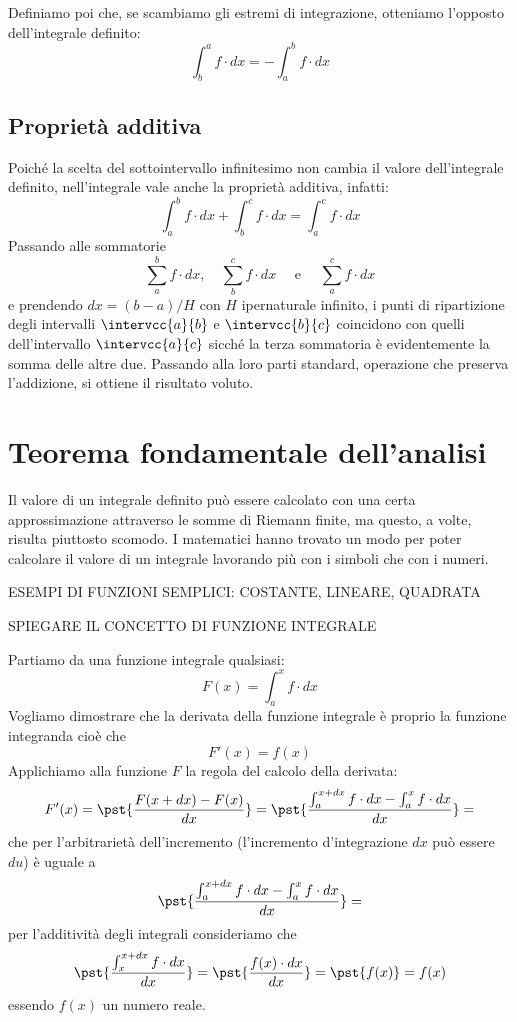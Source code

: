 Definiamo poi che, se scambiamo gli estremi di integrazione, otteniamo 
l'opposto dell'integrale definito:
\[\int_b^a f \cdot dx = - \int_a^b f \cdot dx\]

\subsection{Proprietà additiva}
\label{subsec:integrali_proprieta_additiva}

Poiché la scelta del sottointervallo infinitesimo non cambia il valore 
dell'integrale definito, 
nell'integrale vale anche la proprietà additiva, infatti: 
\[\int_a^b f \cdot dx + \int_b^c f \cdot dx = \int_a^c f \cdot 
dx\] 
Passando alle sommatorie 
\[\sum_a^b f \cdot dx,\quad \sum_b^c f \cdot dx \quad\text{ e } \quad 
  \sum_a^c f \cdot dx\] 
e prendendo 
\(dx = (b-a)/H\)
con \(H\) ipernaturale infinito, 
i punti di ripartizione degli intervalli \(\intervcc{a}{b}\) e 
\(\intervcc{b}{c}\) coincidono con quelli dell'intervallo \(\intervcc{a}{c}\)
sicché la terza sommatoria è evidentemente la somma delle altre due.
Passando alla loro parti standard, operazione che preserva l'addizione, si 
ottiene il risultato voluto.

\section{Teorema fondamentale dell'analisi}
\label{sec:integrali_teorema_fondamentale}

Il valore di un integrale definito può essere calcolato con una certa 
approssimazione attraverso le somme di Riemann finite, ma questo, a volte, 
risulta piuttosto scomodo. I matematici hanno trovato un modo per poter 
calcolare il valore di un integrale lavorando più con i simboli che con i 
numeri.

ESEMPI DI FUNZIONI SEMPLICI: COSTANTE, LINEARE, QUADRATA %

SPIEGARE IL CONCETTO DI FUNZIONE INTEGRALE %

Partiamo da una funzione integrale qualsiasi: 
\[F(x) = \int_a^x f \cdot dx\]
Vogliamo dimostrare che la derivata della funzione integrale è proprio la 
funzione integranda cioè che  
\[F'(x) = f(x)\]
Applichiamo alla funzione \(F\) la regola del calcolo della derivata:
\[F'(x) = \pst{\frac{F(x+dx)-F(x)}{dx}} = 
\pst{\frac{\int_a^{x+dx} f \cdot dx - \int_a^x f \cdot dx}{dx}} =\] 
che per l'arbitrarietà dell'incremento (l'incremento d'integrazione \(dx\) 
può essere \(du\)) è uguale a
\[\pst{\frac{\int_a^{x+dx} f \cdot dx - \int_a^x f \cdot dx}{dx}} =\]
per l'additività degli integrali consideriamo che
\[\pst{\frac{\int_x^{x+dx} f \cdot dx}{dx}} = 
    \pst{\frac{f(x) \cdot dx}{dx}} = \pst{f(x)} = f(x)\]
essendo \(f(x)\) un numero reale. 

